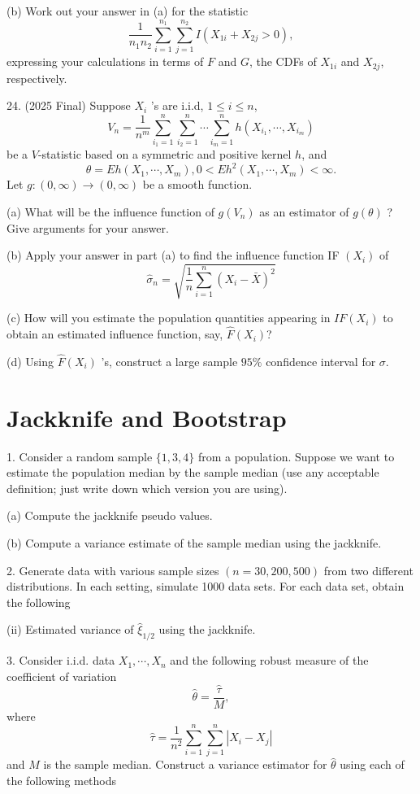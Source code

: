 \documentclass[11pt]{article}
\theoremstyle{definition}
\begin{document}
(b) Work out your answer in (a) for the statistic
$$
\frac{1}{n_1 n_2} \sum_{i=1}^{n_1} \sum_{j=1}^{n_2} I\left(X_{1 i}+X_{2 j}>0\right),
$$
expressing your calculations in terms of $F$ and $G$, the CDFs of $X_{1 i}$ and $X_{2 j}$, respectively.

24. (2025 Final) Suppose $X_i$ 's are i.i.d, $1 \leq i \leq n$,
$$
V_n=\frac{1}{n^m} \sum_{i_1=1}^n \sum_{i_2=1}^n \cdots \sum_{i_m=1}^n h\left(X_{i_1}, \cdots, X_{i_m}\right)
$$
be a $V$-statistic based on a symmetric and positive kernel $h$, and
$$
\theta=E h\left(X_1, \cdots, X_m\right), 0<E h^2\left(X_1, \cdots, X_m\right)<\infty .
$$
Let $g:(0, \infty) \rightarrow(0, \infty)$ be a smooth function.

(a) What will be the influence function of $g\left(V_n\right)$ as an estimator of $g(\theta)$ ? Give arguments for your answer.

(b) Apply your answer in part (a) to find the influence function IF $\left(X_i\right)$ of
$$
\widehat{\sigma}_n=\sqrt{\frac{1}{n} \sum_{i=1}^n\left(X_i-\bar{X}\right)^2}
$$

(c) How will you estimate the population quantities appearing in $I F\left(X_i\right)$ to obtain an estimated influence function, say, $\widehat{F}\left(X_i\right)$?

(d) Using $\widehat{F}\left(X_i\right)$ 's, construct a large sample $95 \%$ confidence interval for $\sigma$.

\newpage
\section{Jackknife and Bootstrap}
1. Consider a random sample $\{1,3,4\}$ from a population. Suppose we want to estimate the population median by the sample median (use any acceptable definition; just write down which version you are using).

(a) Compute the jackknife pseudo values.

(b) Compute a variance estimate of the sample median using the jackknife.

2. Generate data with various sample sizes $(n=30,200,500)$ from two different distributions. In each setting, simulate 1000 data sets. For each data set, obtain the following

(ii) Estimated variance of $\widehat{\xi}_{1 / 2}$ using the jackknife.

3. Consider i.i.d. data $X_1, \cdots, X_n$ and the following robust measure of the coefficient of variation
$$
\widehat{\theta}=\frac{\widehat{\tau}}{M},
$$
where
$$
\widehat{\tau}=\frac{1}{n^2} \sum_{i=1}^n \sum_{j=1}^n\left|X_i-X_j\right|
$$
and $M$ is the sample median.
Construct a variance estimator for $\widehat{\theta}$ using each of the following methods
\end{document}
